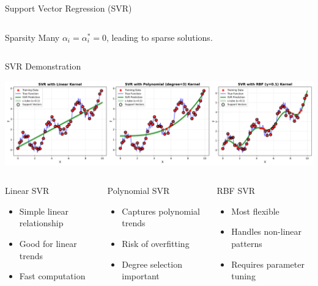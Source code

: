 \documentclass[8pt,aspectratio=1610]{beamer}
\begin{document}
\begin{frame}{Support Vector Regression (SVR)}
\begin{columns}[t]
\begin{column}{0.48\textwidth}
\vspace{0.3cm}
\begin{alertblock}{Sparsity}
Many $\alpha_i = \alpha_i^* = 0$, leading to sparse solutions.
\end{alertblock}
\end{column}
\end{columns}
\end{frame}

\begin{frame}{SVR Demonstration}
\begin{center}
\includegraphics[width=\textwidth]{../figures/svr_demonstration.png}
\end{center}

\begin{columns}[t]
\begin{column}{0.32\textwidth}
\begin{block}{Linear SVR}
\begin{itemize}
\setlength{\itemsep}{1pt}
\item Simple linear relationship
\item Good for linear trends
\item Fast computation
\end{itemize}
\end{block}
\end{column}

\begin{column}{0.32\textwidth}
\begin{block}{Polynomial SVR}
\begin{itemize}
\setlength{\itemsep}{1pt}
\item Captures polynomial trends
\item Risk of overfitting
\item Degree selection important
\end{itemize}
\end{block}
\end{column}

\begin{column}{0.32\textwidth}
\begin{block}{RBF SVR}
\begin{itemize}
\setlength{\itemsep}{1pt}
\item Most flexible
\item Handles non-linear patterns
\item Requires parameter tuning
\end{itemize}
\end{block}
\end{column}
\end{columns}
\end{frame}
\end{document}

